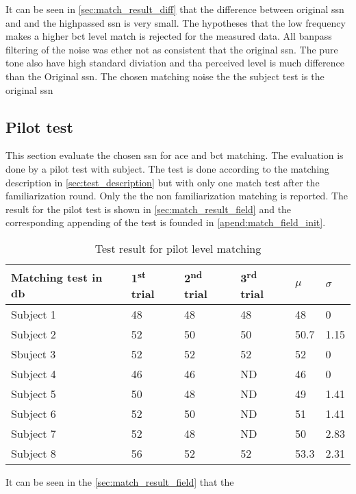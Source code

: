 It can be seen in \autoref{sec:match_result_diff} that the difference between original \gls{ssn} and and the highpassed \gls{ssn} is very small. The hypotheses that the low frequency makes a higher \gls{bct} level match is rejected for the measured data. All banpass filtering of the noise was ether not as consistent that the original \gls{ssn}. The pure tone also have high standard diviation and tha perceived level is much difference than the Original \gls{ssn}. The chosen matching noise the the subject test is the original \gls{ssn}



\subsection{Pilot test}
This section evaluate the chosen \gls{ssn} for \gls{ace} and \gls{bct} matching. The evaluation is done by a pilot test with subject. The test is done according to the matching description in \autoref{sec:test_description} but with only one match test after the familiarization round. Only the the non familiarization matching is reported. The result for the pilot test is shown in \autoref{sec:match_result_field} and the corresponding appending of the test is founded in \autoref{apend:match_field_init}.

\begin{table}[H]
\centering
\caption{Test result for pilot level matching}
\begin{tabular}{l|lll|ll}
Matching test in \si{\decibel}   & 1\textsuperscript{st} trial & 2\textsuperscript{nd} trial & 3\textsuperscript{rd} trial & $\mu$ & $\sigma$ \\ \hline
Subject 1  & 48          & 48           & 48          & 48          & 0                  \\
Subject 2  & 52          & 50           & 50          & 50.7        & 1.15               \\
Sbuject 3  & 52          & 52           & 52          & 52          & 0                  \\
Subject 4  & 46          & 46           & ND          & 46          & 0                  \\
Subject 5  & 50          & 48           & ND          & 49          & 1.41               \\
Subject 6  & 52          & 50           & ND          & 51          & 1.41               \\
Subject 7  & 52          & 48           & ND          & 50          & 2.83               \\
Subject 8  & 56          & 52           & 52          & 53.3        & 2.31             
\end{tabular}
\label{sec:match_result_field}
\end{table}

It can be seen in the \autoref{sec:match_result_field} that the 